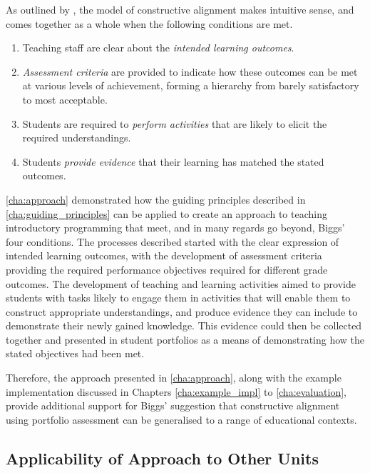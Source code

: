 As outlined by \citet{Biggs:1996c}, the model of constructive alignment makes intuitive sense, and comes together as a whole when the following conditions are met.
\begin{enumerate}
	\item Teaching staff are clear about the \emph{intended learning outcomes}.
	\item \emph{Assessment criteria} are provided to indicate how these outcomes can be met at various levels of achievement, forming a hierarchy from barely satisfactory to most acceptable.
	\item Students are required to \emph{perform activities} that are likely to elicit the required understandings.
	\item Students \emph{provide evidence} that their learning has matched the stated outcomes.
\end{enumerate}

\cref{cha:approach} demonstrated how the guiding principles described in \cref{cha:guiding_principles} can be applied to create an approach to teaching introductory programming that meet, and in many regards go beyond, Biggs' four conditions. The processes described started with the clear expression of intended learning outcomes, with the development of assessment criteria providing the required performance objectives required for different grade outcomes. The development of teaching and learning activities aimed to provide students with tasks likely to engage them in activities that will enable them to construct appropriate understandings, and produce evidence they can include to demonstrate their newly gained knowledge. This evidence could then be collected together and presented in student portfolios as a means of demonstrating how the stated objectives had been met.

Therefore, the approach presented in \cref{cha:approach}, along with the example implementation discussed in Chapters \ref{cha:example_impl} to \ref{cha:evaluation}, provide additional support for Biggs' suggestion that constructive alignment using portfolio assessment can be generalised to a range of educational contexts.


\subsection{Applicability of Approach to Other Units} %
 \label{sub:applicability_of_approach_to_other_units}
 
